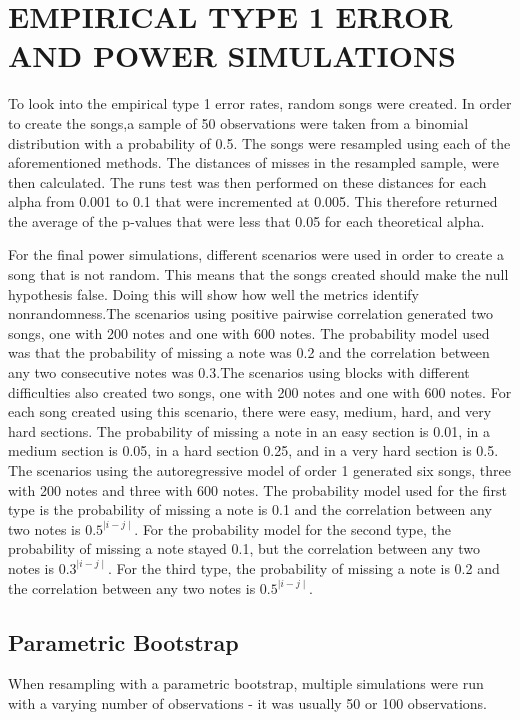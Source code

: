 \documentclass[12pt, letterpaper]{article}
\begin{document}
\section{EMPIRICAL TYPE 1 ERROR AND POWER SIMULATIONS}
To look into the empirical type 1 error rates, random songs were created. In order to create the songs,a sample of 50 observations were taken from a binomial distribution with a probability of 0.5. The songs were resampled using each of the aforementioned methods. The distances of misses in the resampled sample, were then calculated. The runs test was then performed on these distances for each alpha from 0.001 to 0.1 that were incremented at 0.005. This therefore returned the average of the p-values that were less that 0.05 for each theoretical alpha. 

For the final power simulations, different scenarios were used in order to create a song that is not random. This means that the songs created should make the null hypothesis false. Doing this will show how well the metrics identify nonrandomness.The scenarios using positive pairwise correlation generated two songs, one with 200 notes and one with 600 notes. The probability model used was that the probability of missing a note was 0.2 and the correlation between any two consecutive notes was 0.3.The scenarios using blocks with different difficulties also created two songs, one with 200 notes and one with 600 notes. For each song created using this scenario, there were easy, medium, hard, and very hard sections. The probability of missing a note in an easy section is 0.01, in a medium section is 0.05, in a hard section 0.25, and in a very hard section is 0.5. The scenarios using the autoregressive model of order 1 generated six songs, three with 200 notes and three with 600 notes. The probability model used for the first type is the probability of missing a note is 0.1 and the correlation between any two notes is $0.5^{\mid i-j \mid}$. For the probability model for the second type, the probability of missing a note stayed 0.1, but the correlation between any two notes is $0.3^{\mid i-j \mid}$. For the third type, the probability of missing a note is 0.2 and the correlation between any two notes is $0.5^{\mid i-j \mid}$.

\subsection{Parametric Bootstrap}
When resampling with a parametric bootstrap, multiple simulations were run with a varying number of observations - it was usually 50 or 100 observations.  
\end{document}
